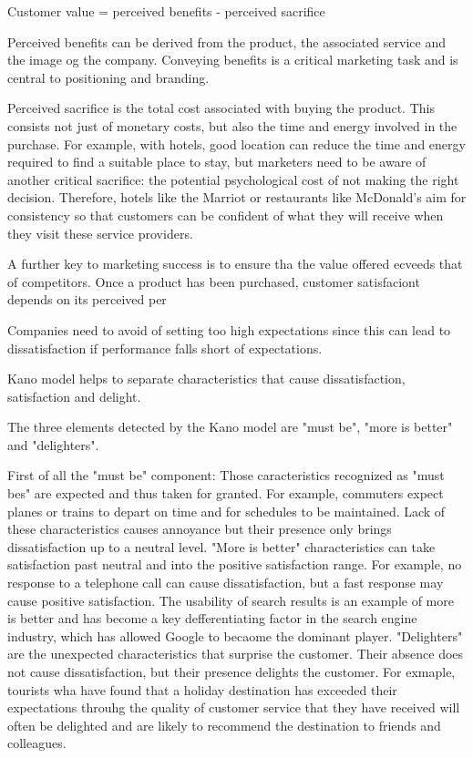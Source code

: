 \documentclass{article}
\begin{document}
Customer value = perceived benefits - perceived sacrifice

Perceived benefits can be derived from the product, the associated service and the image og the company. Conveying benefits is a critical marketing task and is central to positioning and branding. 

Perceived sacrifice is the total cost associated with buying the product. This consists not just of monetary costs, but also the time and energy involved in the purchase. For example, with hotels, good location can reduce the time and energy required to find a suitable place to stay, but marketers need to be aware of another critical sacrifice: the potential psychological cost of not making the right decision. Therefore, hotels like the Marriot or restaurants like McDonald's aim for consistency so that customers can be confident of what they will receive when they visit these service providers. 

A further key to marketing success is to ensure tha the value offered ecveeds that of competitors. Once a product has been purchased, customer satisfaciont depends on its perceived per

Companies need to avoid of setting too high expectations since this can lead to dissatisfaction if performance falls short of expectations. 

Kano model helps to separate characteristics that cause dissatisfaction, satisfaction and delight. 

The three elements detected by the Kano model are "must be", "more is better" and "delighters".

First of all the "must be" component: Those caracteristics recognized as "must bes" are expected and thus taken for granted. For example, commuters expect planes or trains to depart on time and for schedules to be maintained. Lack of these characteristics causes annoyance but their presence only brings dissatisfaction up to a neutral level. "More is better" characteristics can take satisfaction past neutral and into the positive satisfaction range. For example, no response to a telephone call can cause dissatisfaction, but a fast response may cause positive satisfaction. The usability of search results is an example of more is better and has become a key defferentiating factor in the search engine industry, which has allowed Google to becaome the dominant player. "Delighters" are the unexpected characteristics that surprise the customer. Their absence does not cause dissatisfaction, but their presence delights the customer. For exmaple, tourists wha have found that a holiday destination has exceeded their expectations throuhg the quality of customer service that they have received will often be delighted and are likely to recommend the destination to friends and colleagues. 
\end{document}
